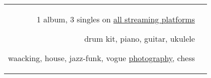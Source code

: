 \documentclass[10pt]{article} %
\begin{document}
\begin{paracol}{1}




\begin{supertabular}{rl} %

	
	
	
	{} %
	{1 album, 3 singles on \href{http://sabinasagynbayeva.tilda.ws/music}{all streaming platforms}} %
	{} %
	{} %
	{}
	
	
	{} %
	{drum kit, piano, guitar, ukulele} %
	{} %
	{} %
	{}
		
	{} %
	{waacking, house, jazz-funk, vogue} %
	{} %
	{} %
	{}
	{} %
	{\href{http://sabinasagynbayeva.tilda.ws/photography}{photography}, chess} %
	{} %
	{} %
	{}

\end{supertabular}
\end{paracol}

\end{document}
